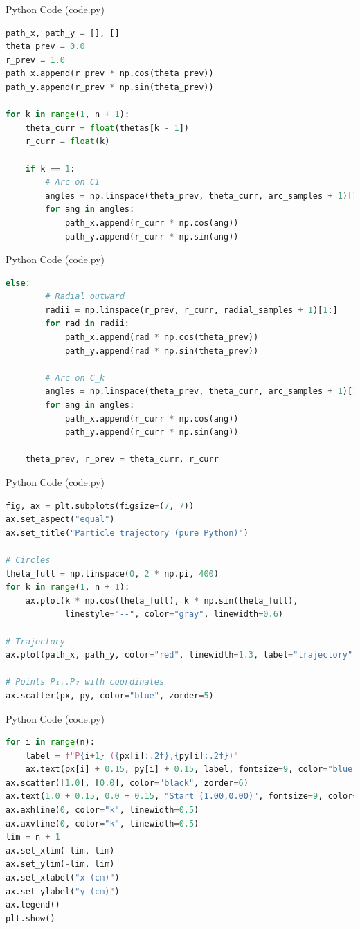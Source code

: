 \documentclass{beamer}
\begin{document}
\begin{frame}[fragile]{Python Code (code.py)}
\begin{lstlisting}[language=Python]
path_x, path_y = [], []
theta_prev = 0.0
r_prev = 1.0
path_x.append(r_prev * np.cos(theta_prev))
path_y.append(r_prev * np.sin(theta_prev))

for k in range(1, n + 1):
    theta_curr = float(thetas[k - 1])
    r_curr = float(k)

    if k == 1:
        # Arc on C1
        angles = np.linspace(theta_prev, theta_curr, arc_samples + 1)[1:]
        for ang in angles:
            path_x.append(r_curr * np.cos(ang))
            path_y.append(r_curr * np.sin(ang))
\end{lstlisting}
\end{frame}
\begin{frame}[fragile]{Python Code (code.py)}
\begin{lstlisting}[language=Python]
    else:
        # Radial outward
        radii = np.linspace(r_prev, r_curr, radial_samples + 1)[1:]
        for rad in radii:
            path_x.append(rad * np.cos(theta_prev))
            path_y.append(rad * np.sin(theta_prev))

        # Arc on C_k
        angles = np.linspace(theta_prev, theta_curr, arc_samples + 1)[1:]
        for ang in angles:
            path_x.append(r_curr * np.cos(ang))
            path_y.append(r_curr * np.sin(ang))

    theta_prev, r_prev = theta_curr, r_curr
\end{lstlisting}
\end{frame}
\begin{frame}[fragile]{Python Code (code.py)}
\begin{lstlisting}[language=Python]
fig, ax = plt.subplots(figsize=(7, 7))
ax.set_aspect("equal")
ax.set_title("Particle trajectory (pure Python)")

# Circles
theta_full = np.linspace(0, 2 * np.pi, 400)
for k in range(1, n + 1):
    ax.plot(k * np.cos(theta_full), k * np.sin(theta_full),
            linestyle="--", color="gray", linewidth=0.6)

# Trajectory
ax.plot(path_x, path_y, color="red", linewidth=1.3, label="trajectory")

# Points P₁..P₇ with coordinates
ax.scatter(px, py, color="blue", zorder=5)
\end{lstlisting}
\end{frame}
\begin{frame}[fragile]{Python Code (code.py)}
\begin{lstlisting}[language=Python]
for i in range(n):
    label = f"P{i+1} ({px[i]:.2f},{py[i]:.2f})"
    ax.text(px[i] + 0.15, py[i] + 0.15, label, fontsize=9, color="blue")
ax.scatter([1.0], [0.0], color="black", zorder=6)
ax.text(1.0 + 0.15, 0.0 + 0.15, "Start (1.00,0.00)", fontsize=9, color="black")
ax.axhline(0, color="k", linewidth=0.5)
ax.axvline(0, color="k", linewidth=0.5)
lim = n + 1
ax.set_xlim(-lim, lim)
ax.set_ylim(-lim, lim)
ax.set_xlabel("x (cm)")
ax.set_ylabel("y (cm)")
ax.legend()
plt.show()
\end{lstlisting}
\end{frame}
\end{document}

